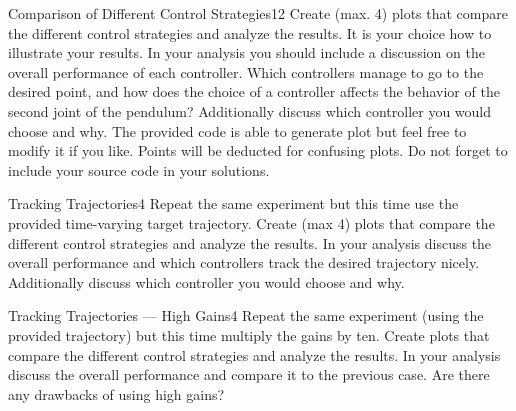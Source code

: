 \begin{questions}
\begin{question}{Comparison of Different Control Strategies}{12}
		Create (max. 4) plots that compare the different control strategies and analyze the results. It is your choice how to illustrate your results. In your analysis you should include a discussion on the overall performance of each controller. Which controllers manage to go to the desired point, and how does the choice of a controller affects the behavior of the second joint of the pendulum? Additionally discuss which controller you would choose and why. The provided code is able to generate plot but feel free to modify it if you like. Points will be deducted for confusing plots. Do not forget to include your source code in your solutions.
		
\begin{answer}
\end{answer}
		
	\end{question}
	
	
	\begin{question}{Tracking Trajectories}{4}
		Repeat the same experiment but this time use the provided time-varying target trajectory. Create (max 4) plots that compare the different control strategies and analyze the results. In your analysis discuss the overall performance and which controllers track the desired trajectory nicely. Additionally discuss which controller you would choose and why.
		
\begin{answer}
\end{answer}
		
	\end{question}
	
	
	\begin{question}{Tracking Trajectories --- High Gains}{4}
		Repeat the same experiment (using the provided trajectory) but this time multiply the gains by ten. Create plots that compare the different control strategies and analyze the results. In your analysis discuss the overall performance and compare it to the previous case. Are there any drawbacks of using high gains?
		
\begin{answer}
\end{answer}
		
	\end{question}
	
	

\end{questions}
